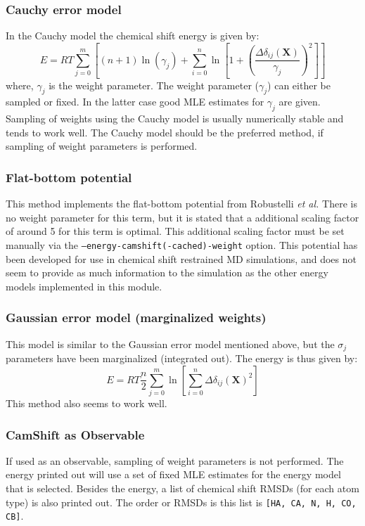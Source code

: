 \subsubsection{Cauchy error model}
In the Cauchy model the chemical shift energy is given by:
\begin{equation}
    E = RT \sum_{j=0}^{m} \left[(n+1) \ln{ \left(\gamma_j \right)} 
    + \sum_{i=0}^{n} \ln{\left[ 1 + \left(\frac{\Delta\delta_{ij}(\mathbf X)}{\gamma_j} \right)^2\right]}\right]
\end{equation}
where, $\gamma_j$ is the weight parameter.
The weight parameter ($\gamma_j$) can either be sampled or fixed.
In the latter case good MLE estimates for $\gamma_j$ are given.
Sampling of weights using the Cauchy model is usually numerically stable and tends to work well.
The Cauchy model should be the preferred method, if sampling of weight parameters is performed.

\subsubsection{Flat-bottom potential}
This method implements the flat-bottom potential from Robustelli \textit{et al.}\cite{CSMD} 
There is no weight parameter for this term, but it is stated that a additional scaling factor of around 5 for this term is optimal. 
This additional scaling factor must be set manually via the \texttt{--energy-camshift(-cached)-weight} option. 
This potential has been developed for use in chemical shift restrained MD simulations, and does not seem to provide as much information to the simulation as the other energy models implemented in this module.

\subsubsection{Gaussian error model (marginalized weights)}
This model is similar to the Gaussian error model mentioned above, but the $\sigma_j$ parameters have been marginalized (integrated out). The energy is thus given by:
\begin{equation}
    E = RT \frac{n}{2} \sum_{j=0}^{m} \ln{\left[\sum_{i=0}^{n} \Delta\delta_{ij}(\mathbf X)^2\right]}
\end{equation}
This method also seems to work well.

\subsubsection{CamShift as Observable}
If used as an observable, sampling of weight parameters is not performed.
The energy printed out will use a set of fixed MLE estimates for the energy model that is selected.
Besides the energy, a list of chemical shift RMSDs (for each atom type) is also printed out.
The order or RMSDs is this list is \texttt{[HA, CA, N, H, CO, CB]}.

